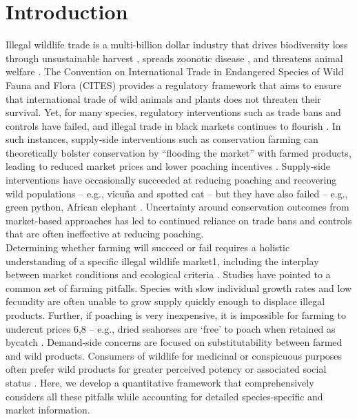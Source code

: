 \newpage

\section{Introduction}
\onehalfspacing
Illegal wildlife trade is a multi-billion dollar industry that drives biodiversity loss through unsustainable harvest \citep{t_sas-rolfes_illegal_2019}, spreads zoonotic disease \citep{bell_animal_2004}, and threatens animal welfare \citep{baker_rough_2013}. The Convention on International Trade in Endangered Species of Wild Fauna and Flora (CITES) provides a regulatory framework that aims to ensure that international trade of wild animals and plants does not threaten their survival. Yet, for many species, regulatory interventions such as trade bans and controls have failed, and illegal trade in black markets continues to flourish \citep{challender_poaching_2014, challender_towards_2015}. In such instances, supply-side interventions such as conservation farming can theoretically bolster conservation by “flooding the market” with farmed products, leading to reduced market prices and lower poaching incentives \citep{gentry_looking_2019, phelps_framework_2014, tensen_under_2016}. Supply-side interventions have occasionally succeeded at reducing poaching and recovering wild populations – e.g., vicuña and spotted cat \citep{iucn_world_2000, sahley_biological_2007} – but they have also failed – e.g., green python, African elephant \citep{lyons_wildlife_2011, hsiang_does_2016}. Uncertainty around conservation outcomes from market-based approaches has led to continued reliance on trade bans and controls that are often ineffective at reducing poaching.
\\
Determining whether farming will succeed or fail requires a holistic understanding of a specific illegal wildlife market1, including the interplay between market conditions and ecological criteria \citep{challender_understanding_2015}. Studies have pointed to a common set of farming pitfalls. Species with slow individual growth rates and low fecundity are often unable to grow supply quickly enough to displace illegal products. Further, if poaching is very inexpensive, it is impossible for farming to undercut prices 6,8 – e.g., dried seahorses are ‘free’ to poach when retained as bycatch \citep{lawson_low_2017}. Demand-side concerns are focused on substitutability between farmed and wild products. Consumers of wildlife for medicinal or conspicuous purposes often prefer wild products for greater perceived potency or associated social status \citep{dutton_stated_2011, gratwicke_attitudes_2008, fabinyi_historical_2012}. Here, we develop a quantitative framework that comprehensively considers all these pitfalls while accounting for detailed species-specific and market information. 
